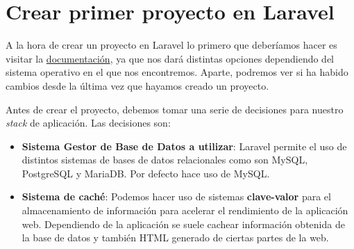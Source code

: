 \chapter{Crear primer proyecto en Laravel}

A la hora de crear un proyecto en Laravel lo primero que deberíamos hacer es visitar la \href{https://laravel.com/docs/10.x/installation}{documentación}, ya que nos dará distintas opciones dependiendo del sistema operativo en el que nos encontremos. Aparte, podremos ver si ha habido cambios desde la última vez que hayamos creado un proyecto.

Antes de crear el proyecto, debemos tomar una serie de decisiones para nuestro \textit{stack} de aplicación. Las decisiones son:

\begin{itemize}
    \item \textbf{Sistema Gestor de Base de Datos a utilizar}: Laravel permite el uso de distintos sistemas de bases de datos relacionales como son MySQL, PostgreSQL y MariaDB. Por defecto hace uso de MySQL.
    \item \textbf{Sistema de caché}: Podemos hacer uso de sistemas \textbf{clave-valor} para el almacenamiento de información para acelerar el rendimiento de la aplicación web. Dependiendo de la aplicación se suele cachear información obtenida de la base de datos y también HTML generado de ciertas partes de la web.

\end{itemize}
